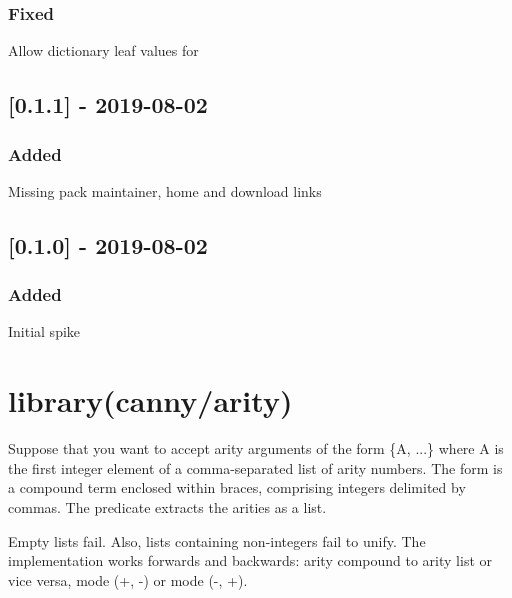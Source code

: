 \subsection{Fixed}

\begin{shortlist}
    \item Allow dictionary leaf values for 
\end{shortlist}

\section{[0.1.1] - 2019-08-02}

\subsection{Added}

\begin{shortlist}
    \item Missing pack maintainer, home and download links
\end{shortlist}

\section{[0.1.0] - 2019-08-02}

\subsection{Added}

\begin{shortlist}
    \item Initial spike
\end{shortlist}

\chapter{library(canny/arity)}\label{sec:arity}

\begin{description}
Suppose that you want to accept arity arguments of the form \{A, ...\}
where A is the first integer element of a comma-separated list of
arity numbers. The  form is a compound term enclosed within
braces, comprising integers delimited by commas. The 
predicate extracts the arities as a list.

Empty lists fail. Also, lists containing non-integers fail to unify.
The implementation works forwards and backwards: arity compound to
arity list or vice versa, mode (+, -) or mode (-, +).
\end{description}

